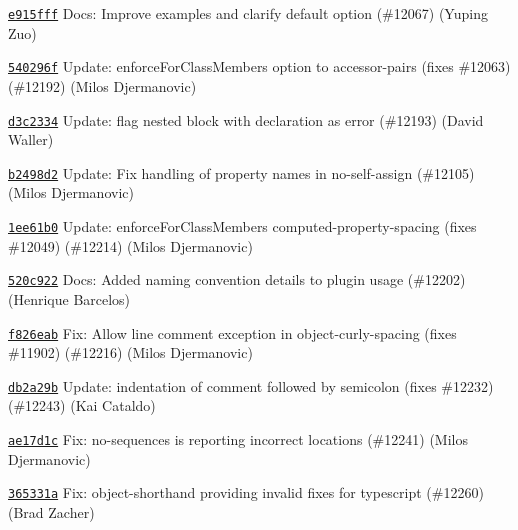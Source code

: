 \begin{DoxyItemize}
\item \href{https://github.com/eslint/eslint/commit/e915fffb6089a23ff1cae926cc607f9b87dc1819}{\texttt{ {\ttfamily e915fff}}} Docs\+: Improve examples and clarify default option (\#12067) (Yuping Zuo)
\item \href{https://github.com/eslint/eslint/commit/540296fcecd232a09dc873a5a22f5839b59b7842}{\texttt{ {\ttfamily 540296f}}} Update\+: enforce\+For\+Class\+Members option to accessor-\/pairs (fixes \#12063) (\#12192) (Milos Djermanovic)
\item \href{https://github.com/eslint/eslint/commit/d3c2334646eae9287d5be9e457d041e445efb512}{\texttt{ {\ttfamily d3c2334}}} Update\+: flag nested block with declaration as error (\#12193) (David Waller)
\item \href{https://github.com/eslint/eslint/commit/b2498d284b9c30ed1543429c2f45d9014e12fe22}{\texttt{ {\ttfamily b2498d2}}} Update\+: Fix handling of property names in no-\/self-\/assign (\#12105) (Milos Djermanovic)
\item \href{https://github.com/eslint/eslint/commit/1ee61b06715fcc750be2c923034a1e59ba663287}{\texttt{ {\ttfamily 1ee61b0}}} Update\+: enforce\+For\+Class\+Members computed-\/property-\/spacing (fixes \#12049) (\#12214) (Milos Djermanovic)
\item \href{https://github.com/eslint/eslint/commit/520c92270eed6e90c1a796e8af275980f01705e0}{\texttt{ {\ttfamily 520c922}}} Docs\+: Added naming convention details to plugin usage (\#12202) (Henrique Barcelos)
\item \href{https://github.com/eslint/eslint/commit/f826eabbeecddb047f58f4e7308a14c18148d369}{\texttt{ {\ttfamily f826eab}}} Fix\+: Allow line comment exception in object-\/curly-\/spacing (fixes \#11902) (\#12216) (Milos Djermanovic)
\item \href{https://github.com/eslint/eslint/commit/db2a29beb0fa28183f65bf9e659c66c03a8918b5}{\texttt{ {\ttfamily db2a29b}}} Update\+: indentation of comment followed by semicolon (fixes \#12232) (\#12243) (Kai Cataldo)
\item \href{https://github.com/eslint/eslint/commit/ae17d1ca59dd466aa64da0680ec2453c2dc3b80d}{\texttt{ {\ttfamily ae17d1c}}} Fix\+: no-\/sequences is reporting incorrect locations (\#12241) (Milos Djermanovic)
\item \href{https://github.com/eslint/eslint/commit/365331a42e22af5a77ac9cfa9673d6a8f653eb5a}{\texttt{ {\ttfamily 365331a}}} Fix\+: object-\/shorthand providing invalid fixes for typescript (\#12260) (Brad Zacher)

\end{DoxyItemize}
